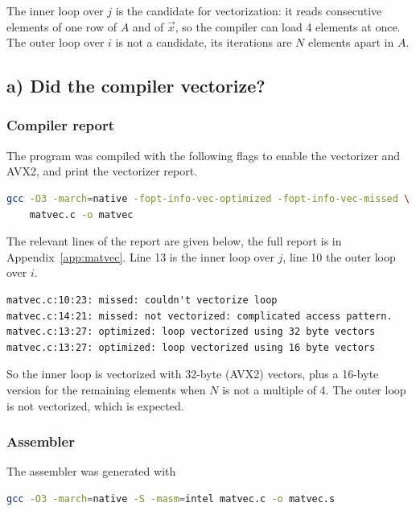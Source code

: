 \documentclass[a4paper,11pt]{article}
\begin{document}
The inner loop over $j$ is the candidate for vectorization: it reads
consecutive elements of one row of $A$ and of $\vec{x}$, so the compiler can
load 4 elements at once. The outer loop over $i$ is not a candidate, its
iterations are $N$ elements apart in $A$.

\subsection{a) Did the compiler vectorize?}

\subsubsection*{Compiler report}

The program was compiled with the following flags to enable the vectorizer and AVX2, and print the vectorizer report.

\begin{lstlisting}[language=bash]
gcc -O3 -march=native -fopt-info-vec-optimized -fopt-info-vec-missed \
    matvec.c -o matvec
\end{lstlisting}

The relevant lines of the report are given below, the full report is in
Appendix~\ref{app:matvec}. Line 13 is the inner loop over $j$, line 10 the
outer loop over $i$.

\begin{lstlisting}[language={}]
matvec.c:10:23: missed: couldn't vectorize loop
matvec.c:14:21: missed: not vectorized: complicated access pattern.
matvec.c:13:27: optimized: loop vectorized using 32 byte vectors
matvec.c:13:27: optimized: loop vectorized using 16 byte vectors
\end{lstlisting}

So the inner loop is vectorized with 32-byte (AVX2) vectors, plus a 16-byte
version for the remaining elements when $N$ is not a multiple of 4. The
outer loop is not vectorized, which is expected.

\subsubsection*{Assembler}

The assembler was generated with

\begin{lstlisting}[language=bash]
gcc -O3 -march=native -S -masm=intel matvec.c -o matvec.s
\end{lstlisting}
\end{document}
